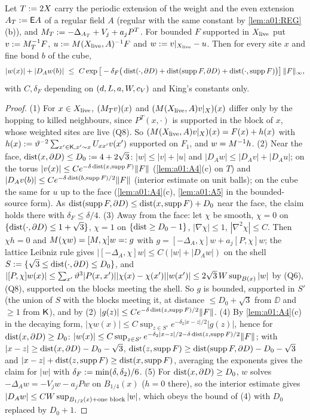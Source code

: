 \begin{lemma}\label{lem:a01:FLD}
Let $T:=2X$ carry the periodic extension of the weight and the even extension $A_T:=\mathsf E A$ of a regular field $A$ (regular with the same constant by \cref{lem:a01:REG}(b)), and $M_T:=-\Delta_{A_T}+V_j+a_jP^T$. For bounded $F$ supported in $X_{\mathrm{live}}$ put $v:=M_T^{-1}F$, $u:=M(X_{\mathrm{live}},A)^{-1}F$ and $w:= v|_{X_{\mathrm{live}}}-u$. Then for every site $x$ and fine bond $b$ of the cube,
\[
|w(x)|+|D_Aw(b)|\ \le\ C\exp\big[-\delta_F\big(\dist(\cdot,\DD)+\dist(\supp F,\DD)+\dist(\cdot,\supp F)\big)\big]\,\norm F_\infty,
\]
with $C,\delta_F$ depending on $(d,L,a,W,c_V)$ and King's constants only.
\end{lemma}
\begin{proof}
(1) For $x\in X_{\mathrm{live}}$, $(M_Tv)(x)$ and $(M(X_{\mathrm{live}},A)v|_X)(x)$ differ only by the hopping to killed neighbours, since $P^T(x,\cdot)$ is supported in the block of $x$, whose weighted sites are live (Q8). So $(M(X_{\mathrm{live}},A)v|_X)(x)=F(x)+h(x)$ with $h(x):=\vartheta^{-2}\sum_{x'\in\mathsf K,x'\sim x}U_{xx'}v(x')$ supported on $F_1$, and $w=M^{-1}h$. (2) Near the face, $\operatorname{dist}(x,\partial D)\le D_0:=4+2\sqrt3$: $|w|\le|v|+|u|$ and $|D_Aw|\le|D_Av|+|D_Au|$; on the torus $|v(x)|\le Ce^{-\delta\operatorname{dist}(x,\operatorname{supp} F)}\lVert F\rVert$ (\cref{lem:a01:A4}(c) on $T$) and $|D_Av(b)|\le Ce^{-\delta\operatorname{dist}(b,\operatorname{supp} F)/2}\lVert F\rVert$ (interior estimate on unit balls); on the cube the same for $u$ up to the face (\cref{lem:a01:A4}(c), \cref{lem:a01:A5} in the bounded-source form). As $\operatorname{dist}(\operatorname{supp} F,\partial D)\le\operatorname{dist}(x,\operatorname{supp} F)+D_0$ near the face, the claim holds there with $\delta_F\le\delta/4$. (3) Away from the face: let $\chi$ be smooth, $\chi=0$ on $\{\operatorname{dist}(\cdot,\partial D)\le1+\sqrt3\}$, $\chi=1$ on $\{\operatorname{dist}\ge D_0-1\}$, $|\nabla\chi|\le1$, $|\nabla^2\chi|\le C$. Then $\chi h=0$ and $M(\chi w)=[M,\chi]w=:g$ with $g=[-\Delta_A,\chi]w+a_j[P,\chi]w$; the lattice Leibniz rule gives $|[-\Delta_A,\chi]w|\le C(|w|+|D_Aw|)$ on the shell $S:=\{\sqrt3\le\operatorname{dist}(\cdot,\partial D)\le D_0\}$, and $|[P,\chi]w(x)|\le\sum_{x'}\vartheta^3|P(x,x')||\chi(x)-\chi(x')||w(x')|\le2\sqrt3\,W\sup_{B(x)}|w|$ by (Q6), (Q8), supported on the blocks meeting the shell. So $g$ is bounded, supported in $S'$ (the union of $S$ with the blocks meeting it, at distance $\le D_0+\sqrt3$ from $\DD$ and $\ge1$ from $\mathsf K$), and by (2) $|g(z)|\le Ce^{-\delta\operatorname{dist}(z,\operatorname{supp} F)/2}\lVert F\rVert$. (4) By \cref{lem:a01:A4}(c) in the decaying form, $|\chi w(x)|\le C\sup_{z\in S'}e^{-\delta_2|x-z|/2}|g(z)|$, hence for $\operatorname{dist}(x,\partial D)\ge D_0$: $|w(x)|\le C\sup_{z\in S'}e^{-\delta_2|x-z|/2-\delta\operatorname{dist}(z,\operatorname{supp} F)/2}\lVert F\rVert$; with $|x-z|\ge\operatorname{dist}(x,\partial D)-D_0-\sqrt3$, $\operatorname{dist}(z,\operatorname{supp} F)\ge\operatorname{dist}(\operatorname{supp} F,\partial D)-D_0-\sqrt3$ and $|x-z|+\operatorname{dist}(z,\operatorname{supp} F)\ge\operatorname{dist}(x,\operatorname{supp} F)$, averaging the exponents gives the claim for $|w|$ with $\delta_F:=\min(\delta,\delta_2)/6$. (5) For $\operatorname{dist}(x,\partial D)\ge D_0$, $w$ solves $-\Delta_Aw=-V_jw-a_jPw$ on $B_{1/4}(x)$ ($h=0$ there), so the interior estimate gives $|D_Aw|\le CW\sup_{B_{1/2}(x)+\text{one block}}|w|$, which obeys the bound of (4) with $D_0$ replaced by $D_0+1$.
\end{proof}

